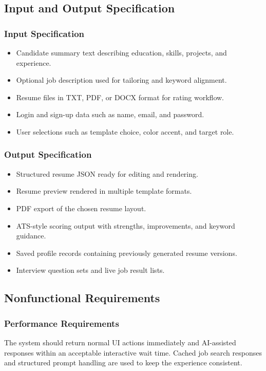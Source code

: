 \subsection{Input and Output Specification}
\subsubsection{Input Specification}
\begin{itemize}
\item Candidate summary text describing education, skills, projects, and experience.
\item Optional job description used for tailoring and keyword alignment.
\item Resume files in TXT, PDF, or DOCX format for rating workflow.
\item Login and sign-up data such as name, email, and password.
\item User selections such as template choice, color accent, and target role.
\end{itemize}

\subsubsection{Output Specification}
\begin{itemize}
\item Structured resume JSON ready for editing and rendering.
\item Resume preview rendered in multiple template formats.
\item PDF export of the chosen resume layout.
\item ATS-style scoring output with strengths, improvements, and keyword guidance.
\item Saved profile records containing previously generated resume versions.
\item Interview question sets and live job result lists.
\end{itemize}

\subsection{Nonfunctional Requirements}
\subsubsection{Performance Requirements}
\noindent The system should return normal UI actions immediately and AI-assisted responses within an acceptable interactive wait time. Cached job search responses and structured prompt handling are used to keep the experience consistent.

